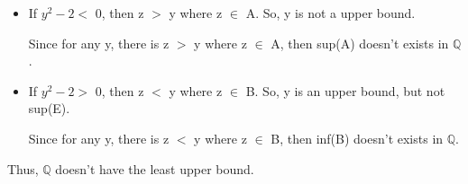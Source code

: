 	\begin{itemize}[leftmargin=1cm, itemsep=0.4em]
		\item If $ y^2-2 < $ 0, then z $>$ y where z $\in$ A.
			So, y is not a upper bound.

			Since for any y, there is z $>$ y where z $\in$ A, then sup(A) doesn't
			exists in $\mathbb{Q}$.
	
		\item If $ y^2-2 > $ 0, then z $<$ y where z $\in$ B.
			So, y is an upper bound, but not sup(E).

			Since for any y, there is z $<$ y where z $\in$ B, then inf(B) doesn't
			exists in $\mathbb{Q}$.
	\end{itemize}

	Thus, $\mathbb{Q}$ doesn't have the least upper bound.
